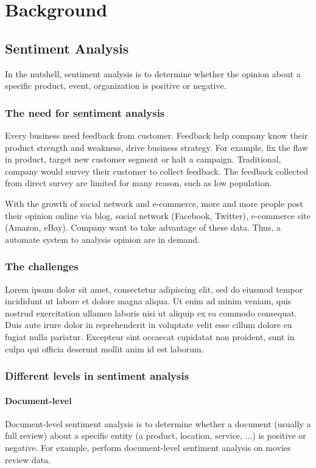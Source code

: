 \chapter{Background}

\section{Sentiment Analysis}
In the nutshell, sentiment analysis is to determine whether the opinion about a specific product, event, organization is positive or negative.  
\subsection{The need for sentiment analysis}
Every business need feedback from customer. Feedback help company know their product strength and weakness, drive business strategy. For example, fix the flaw in product, target new customer segment or halt a campaign. Traditional, company would survey their customer to collect feedback.  The feedback collected from direct survey are limited for many reason, such as low population. 

With the growth of social network and e-commerce, more and more people post their opinion online via blog, social network (Facebook, Twitter), e-commerce site (Amazon, eBay). Company want to take advantage of these data. Thus, a automate system to analysis opinion are in demand. 
            
\subsection{The challenges}
Lorem ipsum dolor sit amet, consectetur adipiscing elit, sed do eiusmod tempor incididunt ut labore et dolore magna aliqua. Ut enim ad minim veniam, quis nostrud exercitation ullamco laboris nisi ut aliquip ex ea commodo consequat. Duis aute irure dolor in reprehenderit in voluptate velit esse cillum dolore eu fugiat nulla pariatur. Excepteur sint occaecat cupidatat non proident, sunt in culpa qui officia deserunt mollit anim id est laborum.

\subsection{Different levels in sentiment analysis}
\subsubsection{Document-level}
Document-level sentiment analysis is to determine whether a document (usually a full review) about a specific entity (a product, location, service, ...) is positive or negative. For example, \cite{pang2002thumbs} perform document-level sentiment analysis on movies review data.
